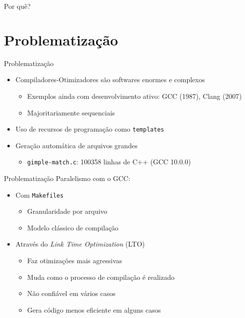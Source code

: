\begin{frame}[standout]
    Por quê?
\end{frame}

\section{Problematização}

\begin{frame}{Problematização}
  \begin{itemize}
    \item Compiladores-Otimizadores são softwares enormes e complexos
        \begin{itemize}
            \item Exemplos ainda com desenvolvimento ativo: GCC (1987), Clang (2007)
            \item Majoritariamente sequenciais
        \end{itemize}
    \item Uso de recursos de programação como \texttt{templates}
    \item Geração automática de arquivos grandes
        \begin{itemize}
            \item \texttt{gimple-match.c}: 100358 linhas de C++ (GCC 10.0.0)
        \end{itemize}
  \end{itemize}
\end{frame}
    
\begin{frame}{Problematização}
    Paralelismo com o GCC:
    \begin{itemize}
        \item Com \texttt{Makefiles}
            \begin{itemize}
                \item Granularidade por arquivo
                \item Modelo clássico de compilação
            \end{itemize}
        \item Através do \textit{Link Time Optimization} (LTO)
            \begin{itemize}
                \item Faz otimizações mais agressivas
                \item Muda como o processo de compilação é realizado
                \item Não confiável em vários casos
                \item Gera código menos eficiente em alguns casos
            \end{itemize}
    \end{itemize}
\end{frame}


